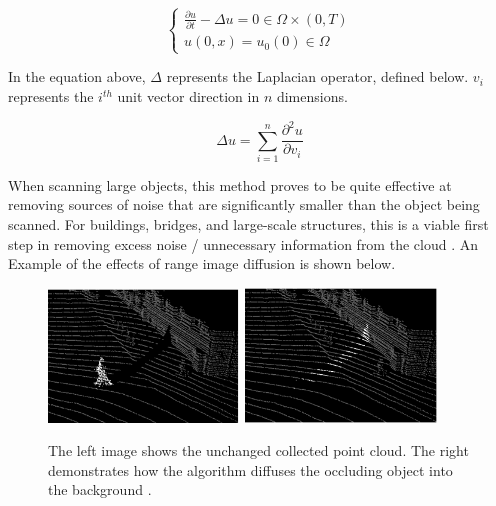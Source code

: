 \documentclass[12pt]{drexelthesis}
\begin{document}
\begin{equation}
		\begin{cases}
			\frac{\partial u}{\partial t} - \Delta u = 0 \in \Omega \times (0,T) \\
			u(0,x) = u_{0}(0) \in \Omega
		\end{cases}
\end{equation}

In the equation above, $\Delta$ represents the Laplacian operator, defined below. $v_{i}$ represents the $i^{th}$ unit vector direction in $n$ dimensions.

\begin{equation}
	\Delta u = \sum_{i = 1}^{n} \frac { \partial^{2} u } { \partial v_{i} } 
\end{equation}

When scanning large objects, this method proves to be quite effective at removing sources of noise that are significantly smaller than the object being scanned. For buildings, bridges, and large-scale structures, this is a viable first step in removing excess noise / unnecessary information from the cloud \cite{RN13}. An Example of the effects of range image diffusion is shown below.

\begin{figure}
	\centering
		\includegraphics[width=2in]{occlusion/rawcloud.png}
		\includegraphics[width=2in]{occlusion/rangediffusion.png}
	\caption[Example of range based occlusion diffusion]{The left image shows the unchanged collected point cloud. The right demonstrates how the algorithm diffuses the occluding object into the background \cite{RN13}. }
\end{figure}
\end{document}

